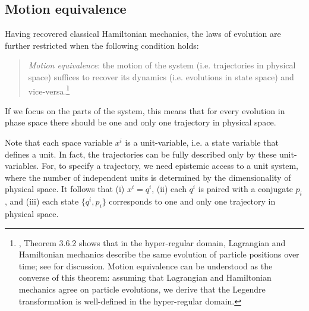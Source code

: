 \documentclass[12pt, english, twoside]{article} %
\newcommand\bs{\begin{singlespace}}
\newcommand\es{\end{singlespace}}
\begin{document}
\subsection{Motion equivalence}
\label{motion}

Having recovered classical Hamiltonian mechanics, the laws of evolution are further restricted when the following condition holds:


\begin{quotation}
\bs \noindent
\textit{Motion equivalence}: the motion of the system (i.e. trajectories in physical space) suffices to recover its dynamics (i.e. evolutions in state space) and vice-versa.\footnote{ \textcites[218]{Abraham}, Theorem 3.6.2 shows that in the hyper-regular domain, Lagrangian and Hamiltonian mechanics describe the same evolution of particle positions over time; see \textcites[1180-1181]{Barrett2} for discussion. Motion equivalence can be understood as the converse of this theorem: assuming that Lagrangian and Hamiltonian mechanics agree on particle evolutions, we derive that the Legendre transformation is well-defined in the hyper-regular domain.} \es
\end{quotation}


\noindent If we focus on the parts of the system, this means that for every evolution in phase space there should be one and only one trajectory in physical space. 

Note that each space variable $x^i$ is a unit-variable, i.e. a state variable that defines a unit. In fact, the trajectories can be fully described only by these unit-variables. For, to specify a trajectory, we need epistemic access to a unit system, where the number of independent units is determined by the dimensionality of physical space. It follows that (i) $x^i = q^i$, (ii) each $q^i$ is paired with a conjugate $p_i$, and (iii) each state $\{q^i, p_i\}$ corresponds to one and only one trajectory in physical space. 
\end{document}
